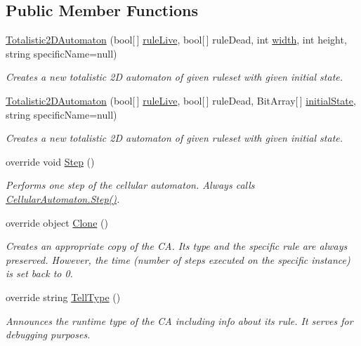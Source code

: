 \subsection*{Public Member Functions}
\begin{DoxyCompactItemize}
\item 
\hyperlink{class_cellular_1_1_totalistic2_d_automaton_a4c7a751baa03c7caf2040d07bb772e91}{Totalistic2\+D\+Automaton} (bool\mbox{[}$\,$\mbox{]} \hyperlink{class_cellular_1_1_totalistic2_d_automaton_a4752e3402c58243f7f342e21ddad3b05}{rule\+Live}, bool\mbox{[}$\,$\mbox{]} rule\+Dead, int \hyperlink{class_cellular_1_1_automaton2_d_a1e9e5ec637c747a859c346839c90d174}{width}, int height, string specific\+Name=null)
\begin{DoxyCompactList}\small\item\em Creates a new totalistic 2\+D automaton of given ruleset with given initial state. \end{DoxyCompactList}\item 
\hyperlink{class_cellular_1_1_totalistic2_d_automaton_a706f4c765a54fef6003e6e208a073a1c}{Totalistic2\+D\+Automaton} (bool\mbox{[}$\,$\mbox{]} \hyperlink{class_cellular_1_1_totalistic2_d_automaton_a4752e3402c58243f7f342e21ddad3b05}{rule\+Live}, bool\mbox{[}$\,$\mbox{]} rule\+Dead, Bit\+Array\mbox{[}$\,$\mbox{]} \hyperlink{all__1_8js_ae8b87ff4be2ae1dd5267342795263360}{initial\+State}, string specific\+Name=null)
\begin{DoxyCompactList}\small\item\em Creates a new totalistic 2\+D automaton of given ruleset with given initial state. \end{DoxyCompactList}\item 
override void \hyperlink{class_cellular_1_1_totalistic2_d_automaton_a7f85cac5420f67a936cbd4cef33c4abc}{Step} ()
\begin{DoxyCompactList}\small\item\em Performs one step of the cellular automaton. Always calls {\ttfamily \hyperlink{class_cellular_1_1_cellular_automaton_aa70848d58015575974bc875ac5a89ae7}{Cellular\+Automaton.\+Step()}}. \end{DoxyCompactList}\item 
override object \hyperlink{class_cellular_1_1_totalistic2_d_automaton_ae78cf4c3f8245adf64ec9a173330804f}{Clone} ()
\begin{DoxyCompactList}\small\item\em Creates an appropriate copy of the C\+A. Its type and the specific rule are always preserved. However, the time (number of steps executed on the specific instance) is set back to 0. \end{DoxyCompactList}\item 
override string \hyperlink{class_cellular_1_1_totalistic2_d_automaton_aa009c674cd109fa70173e9893f6d3b09}{Tell\+Type} ()
\begin{DoxyCompactList}\small\item\em Announces the runtime type of the C\+A including info about its rule. It serves for debugging purposes. \end{DoxyCompactList}\end{DoxyCompactItemize}
